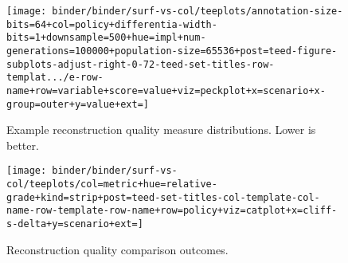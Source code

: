 \begin{figure*}
  \centering
  \begin{subfigure}[b]{0.5\textwidth}
    \centering
    \texttt{[image: binder/binder/surf-vs-col/teeplots/annotation-size-bits=64+col=policy+differentia-width-bits=1+downsample=500+hue=impl+num-generations=100000+population-size=65536+post=teed-figure-subplots-adjust-right-0-72-teed-set-titles-row-templat.../e-row-name+row=variable+score=value+viz=peckplot+x=scenario+x-group=outer+y=value+ext=]}
    \caption{Example reconstruction quality measure distributions. Lower is better.}
    \label{fig:col-vs-surf-example}
  \end{subfigure}%
  \begin{subfigure}[b]{0.5\textwidth}
    \centering
    \texttt{[image: binder/binder/surf-vs-col/teeplots/col=metric+hue=relative-grade+kind=strip+post=teed-set-titles-col-template-col-name-row-template-row-name+row=policy+viz=catplot+x=cliff-s-delta+y=scenario+ext=]}
    \caption{Reconstruction quality comparison outcomes.}
  \label{fig:col-vs-surf-overview}
  \end{subfigure}
  \caption{%
    \textbf{Does column- or surface-based instrumentation give higher-quality reconstruction?}
    Subpanel \ref{fig:col-vs-surf-overview} shows effect sizes of column-vs-surface comparisons for triplet distance and inner node loss metrics across sensitivity analysis conditions.
    Color coding indicates a significant outcome (Mann-Whitney U).
    Surface tends to outperform column under tilted policy and vice versa under steady policy.
    Subpanel \ref{fig:col-vs-surf-example} shows reconstruction quality effects for 64-bit size, bit-differentia annotations with population size 65,536, downsample size 500, and 100k generations.
    Background hatching indicates significant outcome.
    See Supplementary Figure \ref{fig:col-vs-surf} for listing of effects by sensitivity analysis condition.
  }
  \label{fig:col-vs-surf-summary}
\end{figure*}
